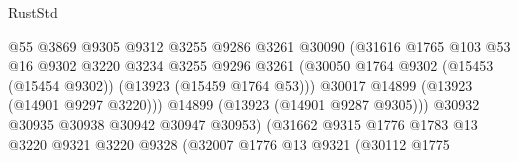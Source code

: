 \begin{lexlean}{RustStd}
\begin{coremodule}
                                            @55
                                            @3869
                                            @9305
                                            @9312
                                            @3255
                                            @9286
                                            @3261
                                            @30090
                                            (@31616
                                              @1765
                                              @103
                                              @53
                                              @16
                                              @9302
                                              @3220
                                              @3234
                                              @3255
                                              @9296
                                              @3261
                                              (@30050
                                                @1764
                                                @9302
                                                (@15453 (@15454 @9302))
                                                (@13923 (@15459 @1764 @53)))
                                              @30017
                                              @14899
                                              (@13923 (@14901 @9297 @3220)))
                                            @14899
                                            (@13923 (@14901 @9287 @9305)))
                                          @30932
                                          @30935
                                          @30938
                                          @30942
                                          @30947
                                          @30953)
                                        (@31662
                                          @9315
                                          @1776
                                          @1783
                                          @13
                                          @3220
                                          @9321
                                          @3220
                                          @9328
                                          (@32007
                                            @1776
                                            @13
                                            @9321
                                            (@30112
                                              @1775

\end{coremodule}
\end{lexlean}
